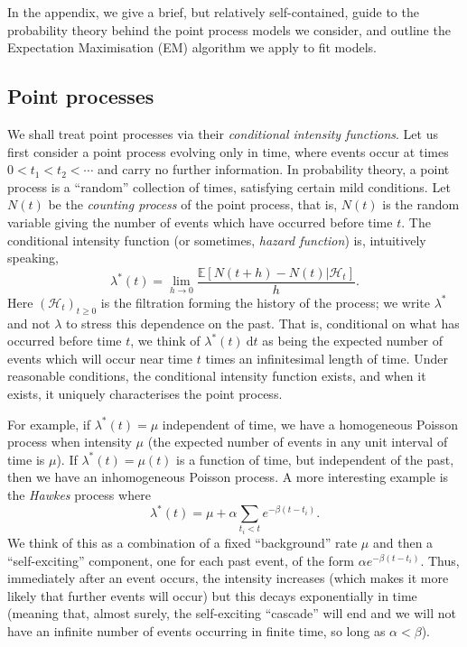 \documentclass[twoside,a4paper]{article}
\theoremstyle{plain}
\theoremstyle{definition}
\newcommand{\mc}{\mathcal}
\newcommand{\rd}{\textrm{d}}
\begin{document}
In the appendix, we give a brief, but relatively self-contained, guide to the probability
theory behind the point process models we consider, and outline the Expectation
Maximisation (EM) algorithm we apply to fit models.


\subsection{Point processes}\label{app:pp}

We shall treat point processes via their \emph{conditional intensity functions}.
Let us first consider a point process evolving only in time, where events occur at times
$0 < t_1 < t_2 < \cdots $ and carry no further information.  In probability theory, a point
process is a ``random'' collection of times, satisfying certain mild conditions.  Let $N(t)$
be the \emph{counting process} of the point process, that is, $N(t)$ is the random variable
giving the number of events which have occurred before time $t$.  The conditional intensity 
function (or sometimes, \emph{hazard function}) is, intuitively speaking,
\[ \lambda^*(t) = \lim_{h\rightarrow 0} \frac{\mathbb E[ N(t+h) - N(t) | \mc H_t ]}{h}. \]
Here $(\mc H_t)_{t\geq 0}$ is the filtration forming the history of the process; we write 
$\lambda^*$ and not $\lambda$ to stress this dependence on the past.
That is, conditional on what has occurred before time $t$, we think of
$\lambda^*(t) \ \rd t$ as being the expected number of events which will occur near time
$t$ times an infinitesimal length of time.  Under reasonable conditions, the conditional 
intensity function exists, and when it exists, it uniquely characterises the point process.

For example, if $\lambda^*(t) = \mu$ independent of time, we have a homogeneous Poisson
process when intensity $\mu$ (the expected number of events in any unit interval of time is
$\mu$).  If $\lambda^*(t) = \mu(t)$ is a function of time, but independent of the past, 
then we have an inhomogeneous Poisson process.  A more interesting example is the \emph{Hawkes}
process where
\[ \lambda^*(t) = \mu + \alpha \sum_{t_i < t} e^{-\beta(t-t_i)}. \]
We think of this as a combination of a fixed ``background'' rate $\mu$ and then a 
``self-exciting'' component, one for each past event, of the form $\alpha e^{-\beta(t-t_i)}$.
Thus, immediately after an event occurs, the intensity increases (which makes it more likely
that further events will occur) but this decays exponentially in time (meaning that, almost
surely, the self-exciting ``cascade'' will end and we will not have an infinite number of
events occurring in finite time, so long as $\alpha < \beta$).
\end{document}

